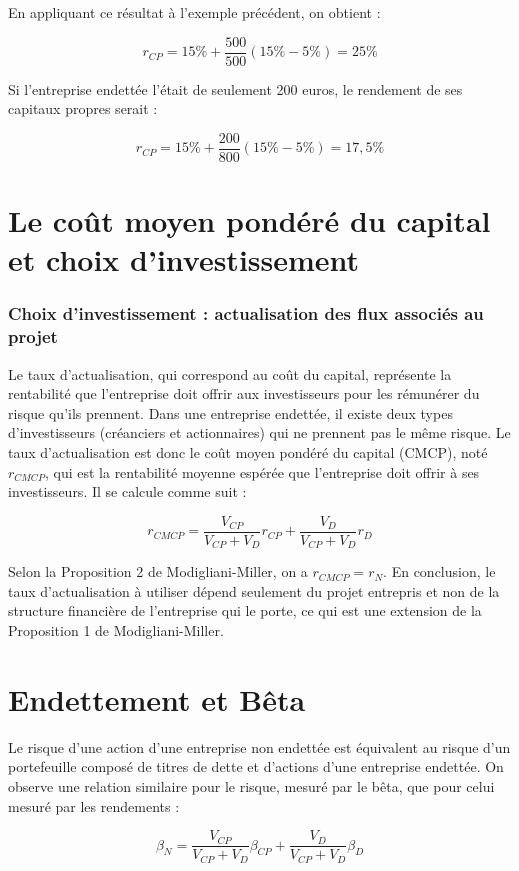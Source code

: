 \documentclass[a4paper, 12pt]{report}
\begin{document}
En appliquant ce résultat à l'exemple précédent, on obtient :

\[
r_{CP} = 15\% + \frac{500}{500}(15\% - 5\%) = 25\%
\]

Si l'entreprise endettée l'était de seulement 200 euros, le rendement de ses capitaux propres serait :

\[
r_{CP} = 15\% + \frac{200}{800}(15\% - 5\%) = 17,5\%
\]

\section{Le coût moyen pondéré du capital et choix d'investissement}

\subsubsection{Choix d'investissement : actualisation des flux associés au projet}

Le taux d'actualisation, qui correspond au coût du capital, représente la rentabilité que l'entreprise doit offrir aux investisseurs pour les rémunérer du risque qu'ils prennent. Dans une entreprise endettée, il existe deux types d'investisseurs (créanciers et actionnaires) qui ne prennent pas le même risque. Le taux d'actualisation est donc le coût moyen pondéré du capital (CMCP), noté \( r_{CMCP} \), qui est la rentabilité moyenne espérée que l'entreprise doit offrir à ses investisseurs. Il se calcule comme suit :

\[
r_{CMCP} = \frac{V_{CP}}{V_{CP} + V_D} r_{CP} + \frac{V_D}{V_{CP} + V_D} r_D
\]

Selon la Proposition 2 de Modigliani-Miller, on a \( r_{CMCP} = r_N \). En conclusion, le taux d'actualisation à utiliser dépend seulement du projet entrepris et non de la structure financière de l'entreprise qui le porte, ce qui est une extension de la Proposition 1 de Modigliani-Miller.

\section{Endettement et Bêta}

Le risque d'une action d'une entreprise non endettée est équivalent au risque d'un portefeuille composé de titres de dette et d'actions d’une entreprise endettée. On observe une relation similaire pour le risque, mesuré par le bêta, que pour celui mesuré par les rendements :

\[
\beta_N = \frac{V_{CP}}{V_{CP} + V_D} \beta_{CP} + \frac{V_D}{V_{CP} + V_D} \beta_D
\]
\end{document}
